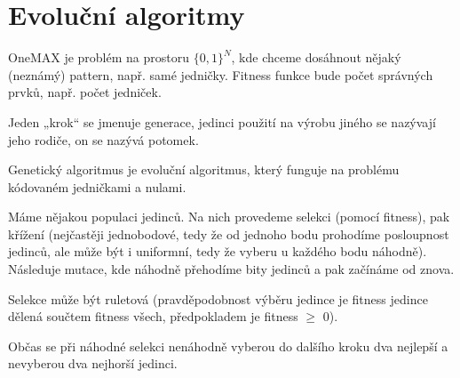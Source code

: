 \documentclass[12pt]{article}					%
\begin{document}

\section{Evoluční algoritmy}
\begin{definice}[OneMAX]
	OneMAX je problém na prostoru $\{0, 1\}^N$, kde chceme dosáhnout nějaký (neznámý) pattern, např. samé jedničky. Fitness funkce bude počet správných prvků, např. počet jedniček.
\end{definice}

\begin{definice}
	Jeden „krok“ se jmenuje generace, jedinci použití na výrobu jiného se nazývají jeho rodiče, on se nazývá potomek.
\end{definice}

\begin{definice}
	Genetický algoritmus je evoluční algoritmus, který funguje na problému kódovaném jedničkami a nulami.
	
	Máme nějakou populaci jedinců. Na nich provedeme selekci (pomocí fitness), pak křížení (nejčastěji jednobodové, tedy že od jednoho bodu prohodíme posloupnost jedinců, ale může být i uniformní, tedy že vyberu u každého bodu náhodně). Následuje mutace, kde náhodně přehodíme bity jedinců a pak začínáme od znova.

	Selekce může být ruletová (pravděpodobnost výběru jedince je fitness jedince dělená součtem fitness všech, předpokladem je fitness $≥$ 0).
\end{definice}

\begin{definice}[Elitismus]
	Občas se při náhodné selekci nenáhodně vyberou do dalšího kroku dva nejlepší a nevyberou dva nejhorší jedinci.
\end{definice}
\end{document}
